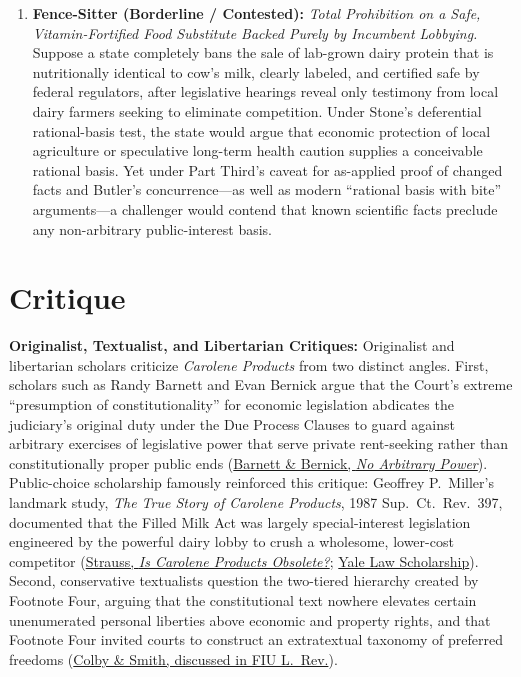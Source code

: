 \documentclass[12pt]{article}
\begin{document}
\begin{enumerate}
    \item \textbf{Fence-Sitter (Borderline / Contested):} \textit{Total Prohibition on a Safe, Vitamin-Fortified Food Substitute Backed Purely by Incumbent Lobbying.} Suppose a state completely bans the sale of lab-grown dairy protein that is nutritionally identical to cow's milk, clearly labeled, and certified safe by federal regulators, after legislative hearings reveal only testimony from local dairy farmers seeking to eliminate competition. Under Stone's deferential rational-basis test, the state would argue that economic protection of local agriculture or speculative long-term health caution supplies a conceivable rational basis. Yet under Part Third's caveat for as-applied proof of changed facts and Butler's concurrence---as well as modern ``rational basis with bite'' arguments---a challenger would contend that known scientific facts preclude any non-arbitrary public-interest basis.
\end{enumerate}

\section{Critique}

\textbf{Originalist, Textualist, and Libertarian Critiques:} Originalist and libertarian scholars criticize \textit{Carolene Products} from two distinct angles. First, scholars such as Randy Barnett and Evan Bernick argue that the Court's extreme ``presumption of constitutionality'' for economic legislation abdicates the judiciary's original duty under the Due Process Clauses to guard against arbitrary exercises of legislative power that serve private rent-seeking rather than constitutionally proper public ends (\href{https://scholarship.law.georgetown.edu/cgi/viewcontent.cgi?article=3162&context=facpub}{Barnett \& Bernick, \textit{No Arbitrary Power}}). Public-choice scholarship famously reinforced this critique: Geoffrey P.~Miller's landmark study, \textit{The True Story of Carolene Products}, 1987 Sup.~Ct.~Rev.~397, documented that the Filled Milk Act was largely special-interest legislation engineered by the powerful dairy lobby to crush a wholesome, lower-cost competitor (\href{https://chicagounbound.uchicago.edu/cgi/viewcontent.cgi?article=2988&context=journal_articles}{Strauss, \textit{Is Carolene Products Obsolete?}}; \href{https://openyls.law.yale.edu/bitstreams/3c63a79b-a00d-4a09-8de5-9363a63ca8a3/download}{Yale Law Scholarship}). Second, conservative textualists question the two-tiered hierarchy created by Footnote Four, arguing that the constitutional text nowhere elevates certain unenumerated personal liberties above economic and property rights, and that Footnote Four invited courts to construct an extratextual taxonomy of preferred freedoms (\href{https://ecollections.law.fiu.edu/cgi/viewcontent.cgi?article=1300&context=lawreview}{Colby \& Smith, discussed in FIU L.~Rev.}).
\end{document}
